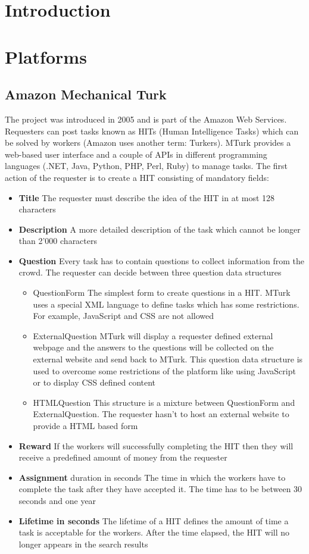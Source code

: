 \section{Introduction}

\section{Platforms}
\subsection{Amazon Mechanical Turk}
The project was introduced in 2005 and is part of the Amazon Web Services. Requesters can post tasks known as HITs (Human Intelligence Tasks) which can be solved by workers (Amazon uses another term: Turkers). MTurk provides a web-based user interface and a couple of APIs in different programming languages (.NET, Java, Python, PHP, Perl, Ruby) to manage tasks. The first action of the requester is to create a HIT consisting of mandatory fields: 
\begin{itemize}
	\item \textbf{Title} The requester must describe the idea of the HIT in at most 128 characters 
	\item \textbf{Description} A more detailed description of the task which cannot be longer than 2'000 characters 
	\item \textbf{Question} Every task has to contain questions to collect information from the crowd. The requester can decide between three question data structures 
	\begin{itemize}
		\item QuestionForm The simplest form to create questions in a HIT. MTurk uses a special XML language to define tasks which has some restrictions. For example, JavaScript and CSS are not allowed 
		\item ExternalQuestion MTurk will display a requester defined external webpage and the answers to the questions will be collected on the external website and send back to MTurk. This question data structure is used to overcome some restrictions of the platform like using JavaScript or to display CSS defined content 
		\item HTMLQuestion This structure is a mixture between QuestionForm and ExternalQuestion. The requester hasn't to host an external website to provide a HTML based form 
	\end{itemize}
	\item \textbf{Reward} If the workers will successfully completing the HIT then they will receive a predefined amount of money from the requester 
	\item \textbf{Assignment} duration in seconds The time in which the workers have to complete the task after they have accepted it. The time has to be between 30 seconds and one year 
	\item \textbf{Lifetime in seconds} The lifetime of a HIT defines the amount of time a task is acceptable for the workers. After the time elapsed, the HIT will no longer appears in the search results 
\end{itemize}
